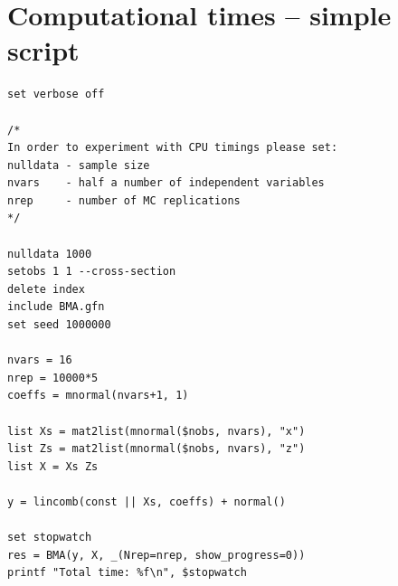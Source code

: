 \section{Computational times -- simple script}\label{sec:CPU_time_data_nvars_nrep}
\begin{lstlisting}
set verbose off

/*
In order to experiment with CPU timings please set:
nulldata - sample size
nvars	 - half a number of independent variables
nrep	 - number of MC replications
*/

nulldata 1000
setobs 1 1 --cross-section
delete index
include BMA.gfn
set seed 1000000

nvars = 16
nrep = 10000*5
coeffs = mnormal(nvars+1, 1)

list Xs = mat2list(mnormal($nobs, nvars), "x")
list Zs = mat2list(mnormal($nobs, nvars), "z")
list X = Xs Zs

y = lincomb(const || Xs, coeffs) + normal()

set stopwatch
res = BMA(y, X, _(Nrep=nrep, show_progress=0))
printf "Total time: %f\n", $stopwatch
\end{lstlisting} 
